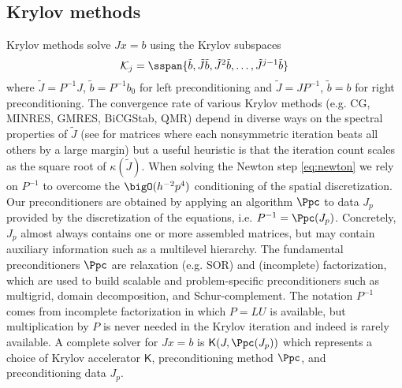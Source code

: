 \subsection{Krylov methods}\label{sec:jfnk:krylov}
Krylov methods solve $J x = b$ using the Krylov subspaces
\begin{equation*}
  \mathcal K_j = \sspan \{\tilde b,\tilde{J} \tilde b, \tilde J^2 \tilde b, \dotsc, \tilde J^{j-1}\tilde b \}
\end{equation*}
where $\tilde J = P^{-1}J$, $\tilde b = P^{-1}b_0$ for left preconditioning and $\tilde J = J P^{-1}$, $\tilde b = b$
for right preconditioning.  The convergence rate of various Krylov methods (e.g. CG, MINRES, GMRES, BiCGStab, QMR)
depend in diverse ways on the spectral properties of $\tilde J$ (see \cite{nachtigal1992fnm} for matrices where each
nonsymmetric iteration beats all others by a large margin) but a useful heuristic is that the iteration count scales as
the square root of $\kappa(\tilde J)$.  When solving the Newton step \eqref{eq:newton} we rely on $P^{-1}$ to overcome
the $\bigO(h^{-2}p^4)$ conditioning of the spatial discretization.  Our preconditioners are obtained by applying an
algorithm $\Ppc$ to data $J_p$ provided by the discretization of the equations, i.e. $P^{-1} = \Ppc(J_p)$.  Concretely,
$J_p$ almost always contains one or more assembled matrices, but may contain auxiliary information such as a multilevel
hierarchy.  The fundamental preconditioners $\Ppc$ are relaxation (e.g. SOR) and (incomplete) factorization, which are
used to build scalable and problem-specific preconditioners such as multigrid, domain decomposition, and
Schur-complement.  The notation $P^{-1}$ comes from incomplete factorization in which $P = LU$ is available, but
multiplication by $P$ is never needed in the Krylov iteration and indeed is rarely available.  A complete solver for $J
x = b$ is $\mathsf K(J,\Ppc(J_p))$ which represents a choice of Krylov accelerator $\mathsf K$, preconditioning method $\Ppc$, and
preconditioning data $J_p$.


